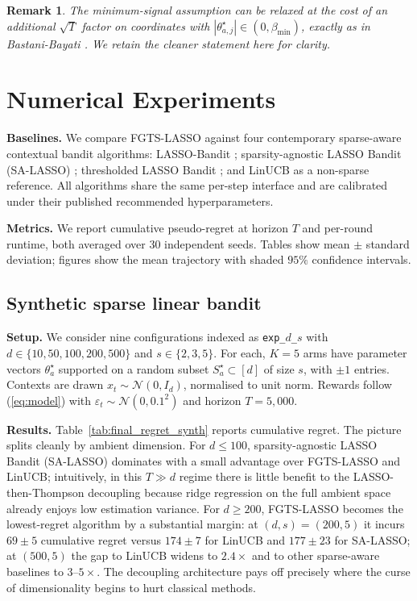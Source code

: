 \documentclass[10pt,journal,twoside,twocolumn]{IEEEtran}
\newtheorem{remark}{Remark}
\begin{document}
\begin{remark}
The minimum-signal assumption can be relaxed at the cost of an additional $\sqrt{T}$ factor on coordinates with $|\theta^\star_{a,j}| \in (0, \beta_{\min})$, exactly as in Bastani-Bayati \cite[Theorem~1]{bastani2020online}. We retain the cleaner statement here for clarity.
\end{remark}

\section{Numerical Experiments}\label{sec:experiments}

\textbf{Baselines.} We compare FGTS-LASSO against four contemporary sparse-aware contextual bandit algorithms: LASSO-Bandit \cite{bastani2020online}; sparsity-agnostic LASSO Bandit (SA-LASSO) \cite{oh2021sparsity}; thresholded LASSO Bandit \cite{ariu2022thresholded}; and LinUCB \cite{chu2011contextual} as a non-sparse reference. All algorithms share the same per-step interface and are calibrated under their published recommended hyperparameters.

\textbf{Metrics.} We report cumulative pseudo-regret at horizon $T$ and per-round runtime, both averaged over 30 independent seeds. Tables show mean $\pm$ standard deviation; figures show the mean trajectory with shaded $95\%$ confidence intervals.

\subsection{Synthetic sparse linear bandit}\label{sec:exp_synth}

\textbf{Setup.} We consider nine configurations indexed as \texttt{exp\_$d$\_$s$} with $d \in \{10,50,100,200,500\}$ and $s \in \{2,3,5\}$. For each, $K = 5$ arms have parameter vectors $\theta^{\star}_a$ supported on a random subset $S^{\star}_a \subset [d]$ of size $s$, with $\pm 1$ entries. Contexts are drawn $x_t \sim \mathcal{N}(0, I_d)$, normalised to unit norm. Rewards follow (\ref{eq:model}) with $\varepsilon_t \sim \mathcal{N}(0, 0.1^2)$ and horizon $T = 5{,}000$.

\textbf{Results.} Table~\ref{tab:final_regret_synth} reports cumulative regret. The picture splits cleanly by ambient dimension. For $d \leq 100$, sparsity-agnostic LASSO Bandit (SA-LASSO) dominates with a small advantage over FGTS-LASSO and LinUCB; intuitively, in this $T \gg d$ regime there is little benefit to the LASSO-then-Thompson decoupling because ridge regression on the full ambient space already enjoys low estimation variance. For $d \geq 200$, FGTS-LASSO becomes the lowest-regret algorithm by a substantial margin: at $(d, s) = (200, 5)$ it incurs $69 \pm 5$ cumulative regret versus $174 \pm 7$ for LinUCB and $177 \pm 23$ for SA-LASSO; at $(500, 5)$ the gap to LinUCB widens to $2.4\times$ and to other sparse-aware baselines to $3$--$5\times$. The decoupling architecture pays off precisely where the curse of dimensionality begins to hurt classical methods.
\end{document}
